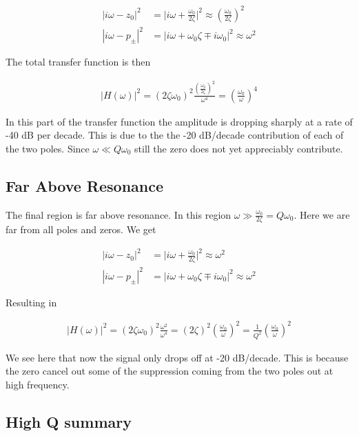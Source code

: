 \documentclass[12pt]{article}
\begin{document}
\begin{align}
|i\omega-z_0|^2 &= \Big\lvert i\omega + \frac{\omega_0}{2\zeta}\Big\rvert^2 \approx \left(\frac{\omega_0}{2\zeta} \right)^2\\
|i\omega-p_{\pm}|^2 &= \lvert i\omega + \omega_0\zeta \mp i\omega_0\rvert^2 \approx \omega^2
\end{align}

The total transfer function is then

\begin{align}
|H(\omega)|^2 = (2\zeta \omega_0)^2 \frac{\left(\frac{\omega_0}{2\zeta} \right)^2}{\omega^4} = \left(\frac{\omega_0}{\omega} \right)^4
\end{align}

In this part of the transfer function the amplitude is dropping sharply at a rate of -40 dB per decade. This is due to the the -20 dB/decade contribution of each of the two poles. Since $\omega \ll Q \omega_0$ still the zero does not yet appreciably contribute.

\subsection{Far Above Resonance}

The final region is far above resonance. In this region $\omega \gg \frac{\omega_0}{2\zeta} = Q\omega_0$. Here we are far from all poles and zeros. We get

\begin{align}
|i\omega-z_0|^2 &= \Big\lvert i\omega + \frac{\omega_0}{2\zeta}\Big\rvert^2 \approx \omega^2\\
|i\omega-p_{\pm}|^2 &= \lvert i\omega + \omega_0\zeta \mp i\omega_0\rvert^2 \approx \omega^2
\end{align}

Resulting in

\begin{align}
|H(\omega)|^2 = (2\zeta \omega_0)^2 \frac{\omega^2}{\omega^4} = (2\zeta)^2 \left(\frac{\omega_0}{\omega} \right)^2 = \frac{1}{Q^2} \left(\frac{\omega_0}{\omega} \right)^2
\end{align}

We see here that now the signal only drops off at -20 dB/decade. This is because the zero cancel out some of the suppression coming from the two poles out at high frequency.

\subsection{High Q summary}
\end{document}
